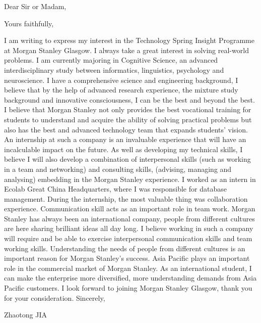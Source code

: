 \documentclass[11pt,a4paper,sans]{moderncv}        %
\begin{document}
\date{January 15, 2020}
\opening{Dear Sir or Madam,}
\closing{Yours faithfully,}
\makelettertitle

I am writing to express my interest in the Technology Spring Insight Programme at Morgan Stanley Glasgow. I always take a great interest in solving real-world problems.
\newline\newline
I am currently majoring in Cognitive Science, an advanced interdisciplinary study between informatics, linguistics, psychology and neuroscience. I have a comprehensive science and engineering background, I believe that by the help of advanced research experience, the mixture study background and innovative consciousness, I can be the best and beyond the best.
\newline\newline
I believe that Morgan Stanley not only provides the best vocational training for students to understand and acquire the ability of solving practical problems but also has the best and advanced technology team that expands students’ vision. An internship at such a company is an invaluable experience that will have an incalculable impact on the future. As well as developing my technical skills, I believe I will also develop a combination of interpersonal skills (such as working in a team and networking) and consulting skills, (advising, managing and analysing) embedding in the Morgan Stanley experience.
\newline\newline
I worked as an intern in Ecolab Great China Headquarters, where I was responsible for database management. During the internship, the most valuable thing was collaboration experience. Communication skill acts as an important role in team work. Morgan Stanley has always been an international company, people from different cultures are here sharing brilliant ideas all day long. I believe working in such a company will require and be able to exercise interpersonal communication skills and team working skills. Understanding the needs of people from different cultures is an important reason for Morgan Stanley’s success. Asia Pacific plays an important role in the commercial market of Morgan Stanley. As an international student, I can make the enterprise more diversified, more understanding demands from Asia Pacific customers.
\newline\newline
I look forward to joining Morgan Stanley Glasgow, thank you for your consideration.
\newline\newline\newline\newline
Sincerely,

Zhaotong JIA

\end{document}
